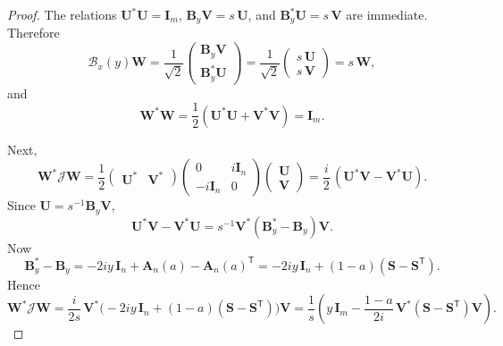 \documentclass[11pt]{article}
\begin{document}
\begin{proof}
The relations \(\mathbf U^*\mathbf U=\mathbf I_m\), \(\mathbf B_y\mathbf V=s\,\mathbf U\), and
\(\mathbf B_y^*\mathbf U=s\,\mathbf V\) are immediate. Therefore
\[
\mathcal B_x(y)\mathbf W
=
\frac{1}{\sqrt2}
\begin{pmatrix}
\mathbf B_y\mathbf V\\
\mathbf B_y^*\mathbf U
\end{pmatrix}
=
\frac{1}{\sqrt2}
\begin{pmatrix}
s\,\mathbf U\\
s\,\mathbf V
\end{pmatrix}
=
s\,\mathbf W,
\]
and
\[
\mathbf W^*\mathbf W
=
\frac12(\mathbf U^*\mathbf U+\mathbf V^*\mathbf V)
=
\mathbf I_m.
\]

Next,
\[
\mathbf W^*\mathcal J\mathbf W
=
\frac12
\begin{pmatrix}\mathbf U^* & \mathbf V^*\end{pmatrix}
\begin{pmatrix}
0 & i\mathbf I_n\\
-i\mathbf I_n & 0
\end{pmatrix}
\begin{pmatrix}\mathbf U\\ \mathbf V\end{pmatrix}
=
\frac{i}{2}\,(\mathbf U^*\mathbf V-\mathbf V^*\mathbf U).
\]
Since \(\mathbf U=s^{-1}\mathbf B_y\mathbf V\),
\[
\mathbf U^*\mathbf V-\mathbf V^*\mathbf U
=
s^{-1}\mathbf V^*(\mathbf B_y^*-\mathbf B_y)\mathbf V.
\]
Now
\[
\mathbf B_y^*-\mathbf B_y
=
-2iy\,\mathbf I_n+\mathbf A_n(a)-\mathbf A_n(a)^{\mathsf T}
=
-2iy\,\mathbf I_n+(1-a)(\mathbf S-\mathbf S^{\mathsf T}).
\]
Hence
\[
\mathbf W^*\mathcal J\mathbf W
=
\frac{i}{2s}\,
\mathbf V^*\bigl(-2iy\,\mathbf I_n+(1-a)(\mathbf S-\mathbf S^{\mathsf T})\bigr)\mathbf V
=
\frac1s
\left(
y\,\mathbf I_m
-
\frac{1-a}{2i}\,\mathbf V^*(\mathbf S-\mathbf S^{\mathsf T})\mathbf V
\right).
\]
\end{proof}
\end{document}

